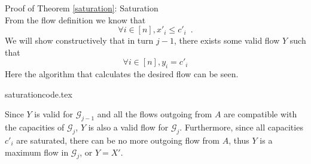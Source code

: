 \begin{sepproof}{Proof of Theorem \ref{saturation}: Saturation} \ \\
  From the flow definition we know that
  \begin{equation}
  \label{saturation:flowleqcap}
    \forall i \in [n], x'_i \leq c'_i \enspace.
  \end{equation}
  We will show constructively that in turn $j-1$, there exists some valid flow $Y$ such that
  \begin{equation*}
    \forall i \in [n], y_i = c'_i
  \end{equation*}
  Here the algorithm that calculates the desired flow can be seen.

  {saturationcode.tex}

  Since $Y$ is valid for $\mathcal{G}_{j-1}$ and all the flows outgoing from $A$ are compatible with the capacities of
  $\mathcal{G}_j$, $Y$ is also a valid flow for $\mathcal{G}_j$. Furthermore, since all capacities $c'_i$ are saturated, there
  can be no more outgoing flow from $A$, thus $Y$ is a maximum flow in $\mathcal{G}_j$, or $Y = X'$.
\end{sepproof}
